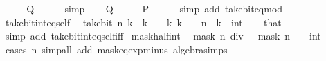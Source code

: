 \begin{isabellebody}
\ \ \isamarkupfalse%
\ \isamarkupfalse%
\ {\isacharquery}{\kern0pt}Q\isanewline
\ \ \ \ \isamarkupfalse%
\ simp\isanewline
{}\isamarkupfalse%
\isanewline
\ \ \isamarkupfalse%
\ {\isacharquery}{\kern0pt}Q\isanewline
\ \ \isamarkupfalse%
\ \isamarkupfalse%
\ {\isacharquery}{\kern0pt}P\isanewline
\ \ \ \ \isamarkupfalse%
\ {\isacharparenleft}{\kern0pt}simp\ add{\isacharcolon}{\kern0pt}\ take{\isacharunderscore}{\kern0pt}bit{\isacharunderscore}{\kern0pt}eq{\isacharunderscore}{\kern0pt}mod{\isacharparenright}{\kern0pt}\isanewline
{}\isamarkupfalse%
%
\endisatagproof
{\isafoldproof}%
%
\isadelimproof
\isanewline
%
\endisadelimproof
\isanewline
{}\isamarkupfalse%
\ take{\isacharunderscore}{\kern0pt}bit{\isacharunderscore}{\kern0pt}int{\isacharunderscore}{\kern0pt}eq{\isacharunderscore}{\kern0pt}self{\isacharcolon}{\kern0pt}\isanewline
\ \ {\isacartoucheopen}take{\isacharunderscore}{\kern0pt}bit\ n\ k\ {\isacharequal}{\kern0pt}\ k{\isacartoucheclose}\ \ {\isacartoucheopen}{}\ {\isasymle}\ k{\isacartoucheclose}\ {\isacartoucheopen}k\ {\isacharless}{\kern0pt}\ {}\ {\isacharcircum}{\kern0pt}\ n{\isacartoucheclose}\ \ k\ {\isacharcolon}{\kern0pt}{\isacharcolon}{\kern0pt}\ int\isanewline
%
\isadelimproof
\ \ %
\endisadelimproof
%
\isatagproof
{}\isamarkupfalse%
\ that\ \isamarkupfalse%
\ {\isacharparenleft}{\kern0pt}simp\ add{\isacharcolon}{\kern0pt}\ take{\isacharunderscore}{\kern0pt}bit{\isacharunderscore}{\kern0pt}int{\isacharunderscore}{\kern0pt}eq{\isacharunderscore}{\kern0pt}self{\isacharunderscore}{\kern0pt}iff{\isacharparenright}{\kern0pt}%
\endisatagproof
{\isafoldproof}%
%
\isadelimproof
\isanewline
%
\endisadelimproof
\isanewline
{}\isamarkupfalse%
\ mask{\isacharunderscore}{\kern0pt}half{\isacharunderscore}{\kern0pt}int{\isacharcolon}{\kern0pt}\isanewline
\ \ {\isacartoucheopen}mask\ n\ div\ {}\ {\isacharequal}{\kern0pt}\ {\isacharparenleft}{\kern0pt}mask\ {\isacharparenleft}{\kern0pt}n\ {\isacharminus}{\kern0pt}\ {}{\isacharparenright}{\kern0pt}\ {\isacharcolon}{\kern0pt}{\isacharcolon}{\kern0pt}\ int{\isacharparenright}{\kern0pt}{\isacartoucheclose}\isanewline
%
\isadelimproof
\ \ %
\endisadelimproof
%
\isatagproof
{}\isamarkupfalse%
\ {\isacharparenleft}{\kern0pt}cases\ n{\isacharparenright}{\kern0pt}\ {\isacharparenleft}{\kern0pt}simp{\isacharunderscore}{\kern0pt}all\ add{\isacharcolon}{\kern0pt}\ mask{\isacharunderscore}{\kern0pt}eq{\isacharunderscore}{\kern0pt}exp{\isacharunderscore}{\kern0pt}minus{\isacharunderscore}{\kern0pt}{}\ algebra{\isacharunderscore}{\kern0pt}simps{\isacharparenright}{\kern0pt}%

\end{isabellebody}
